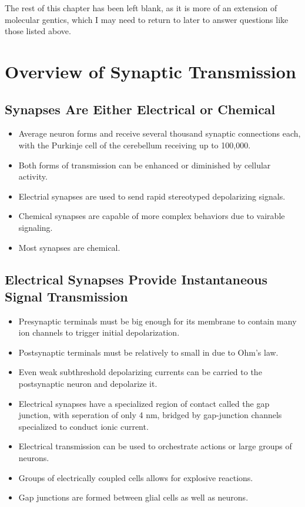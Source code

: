\documentclass[12pt,a4paper]{article}
\begin{document}
    The rest of this chapter has been left blank, as it is more of an extension of molecular gentics, which I may need to return to later to answer questions like those listed above.

\clearpage
{}
\clearpage
\section{Overview of Synaptic Transmission}
\subsection{Synapses Are Either Electrical or Chemical}
\begin{itemize}
    \item Average neuron forms and receive several thousand synaptic connections each, with the Purkinje cell of the cerebellum receiving up to 100,000.
    \item Both forms of transmission can be enhanced or diminished by cellular activity.
    \item Electrial synapses are used to send rapid stereotyped depolarizing signals.
    \item Chemical synapses are capable of more complex behaviors due to vairable signaling. 
    \item Most synapses are chemical.
\end{itemize}
\subsection{Electrical Synapses Provide Instantaneous Signal Transmission}
\begin{itemize}
    \item Presynaptic terminals must be big enough for its membrane to contain many ion channels to trigger initial depolarization.
    \item Postsynaptic terminals must be relatively to small in due to Ohm's law.
    \item Even weak subthreshold depolarizing currents can be carried to the postsynaptic neuron and depolarize it.
    \item Electrical synapses have a specialized region of contact called the gap junction, with seperation of only 4 nm, bridged by gap-junction channels specialized to conduct ionic current.
    \item Electrical transmission can be used to orchestrate actions or large groups of neurons.
    \item Groups of electrically coupled cells allows for explosive reactions.
    \item Gap junctions are formed between glial cells as well as neurons.
\end{itemize}
\end{document}
